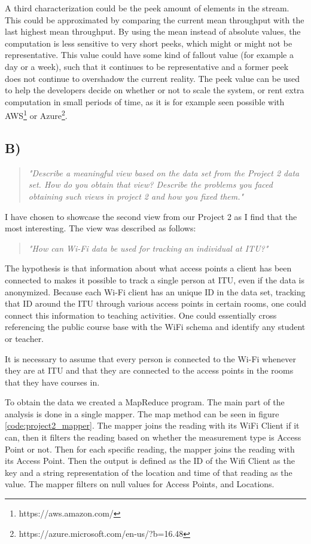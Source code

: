 	\newpar A third characterization could be the peek amount of elements in the stream. This could be approximated by comparing the current mean throughput with the last highest mean throughput. By using the mean instead of absolute values, the computation is less sensitive to very short peeks, which might or might not be representative. This value could have some kind of fallout value (for example a day or a week), such that it continues to be representative and a former peek does not continue to overshadow the current reality. The peek value can be used to help the developers decide on whether or not to scale the system, or rent extra computation in small periods of time, as it is for example seen possible with AWS\footnote{https://aws.amazon.com/} or Azure\footnote{https://azure.microsoft.com/en-us/?b=16.48}.
	
	\subsection{B)}
	\begin{quote}
			\textit{"Describe	a	meaningful	view	based	on	the	data	set	from	the	Project	2	data	set.	How	do	you	obtain	that	view?	Describe	the	problems	you	faced	obtaining	such	views	in	project	2	and	how	you	fixed	them."}
	\end{quote}
	I have chosen to showcase the second view from our Project 2 as I find that the most interesting. The view was described as follows: 
	\begin{quote}
		\textit{"How can Wi-Fi data be used for tracking an individual at ITU?"}
	\end{quote}
	The hypothesis is that information about what access points a client has been connected to makes it possible to track a single person at ITU, even if the data is anonymized. Because each Wi-Fi client has an unique ID in the data set, tracking that ID around the ITU through various access points in certain rooms, one could connect this information to teaching activities. One could essentially cross referencing the public course base with the WiFi schema and identify any student or teacher. 
	
	It is necessary to assume that every person is connected to the Wi-Fi whenever they are at ITU and that they are connected to the access points in the rooms that they have courses in. 
	
	\newpar To obtain the data we created a MapReduce program. The main part of the analysis is done in a single mapper. The map method can be seen in figure \ref{code:project2_mapper}. The mapper joins the reading with its WiFi Client if it can, then it filters the reading based on whether the measurement type is Access Point or not. Then for each specific reading, the mapper joins the reading with its Access Point. Then the output is defined as the ID of the Wifi Client as the key and a string representation of the location and time of that reading as the value. The mapper filters on null values for Access Points, and Locations.
	
